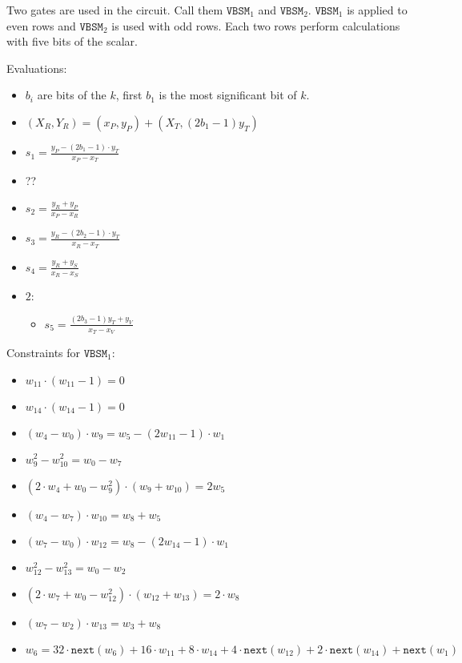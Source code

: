 Two gates are used in the circuit. 
Call them $\texttt{VBSM}_1$ and $\texttt{VBSM}_2$.
$\texttt{VBSM}_1$ is applied to even rows and $\texttt{VBSM}_2$ is used with odd rows. 
Each two rows perform calculations with five bits of the scalar.  

Evaluations:
\begin{itemize}
	\item $b_i$ are bits of the $k$, first $b_1$ is the most significant bit of $k$.
	\item $(X_R, Y_R) = (x_P, y_P) + (X_T, (2b_1 - 1)y_T)$
	\item $s_1 = \frac{y_P - (2b_1 - 1) \cdot y_T}{x_P - x_T}$
	\item  ??
	\item $s_2 = \frac{y_R +y_P}{x_P - x_R}$
	\item $s_3 = \frac{y_R - (2b_2 - 1) \cdot y_T}{x_R - x_T}$
	\item $s_4 = \frac{y_R +y_S}{x_R - x_S}$
	\item $2$:
	\begin{itemize}
		\item $s_5 = \frac{(2b_3 - 1)y_T +y_V}{x_T - x_V}$
	\end{itemize}
\end{itemize}

Constraints for $\texttt{VBSM}_1$:
\begin{itemize}
    \item $w_{11} \cdot (w_{11} - 1) = 0$
    \item $w_{14} \cdot (w_{14} - 1) = 0$
    \item $(w_{4} - w_{0}) \cdot w_9 = w_5 - (2w_{11} - 1) \cdot w_1$
    \item $w_9^2 - w_{10}^2 = w_{0} - w_7$
    \item $(2 \cdot w_{4} + w_{0} - w_9^2) \cdot (w_9 + w_{10}) = 2w_5$
    \item $(w_{4} - w_7) \cdot w_{10} = w_8 + w_5$
    \item $(w_7 - w_{0}) \cdot w_{12} = w_8 - (2w_{14} - 1) \cdot w_1$
    \item $w_{12}^2 - w_{13}^2 = w_{0} - w_2$
    \item $(2 \cdot w_7 + w_{0} - w_{12}^2) \cdot (w_{12} + w_{13}) = 2 \cdot w_8$
    \item $(w_7 - w_2) \cdot w_{13} = w_{3} + w_8$
    \item $w_6 = 32 \cdot \texttt{next}(w_6) + 16 \cdot w_{11} + 8 \cdot w_{14} + 4 \cdot \texttt{next}(w_{12}) + 2 \cdot \texttt{next}(w_{14}) + \texttt{next}(w_1)$
\end{itemize}

